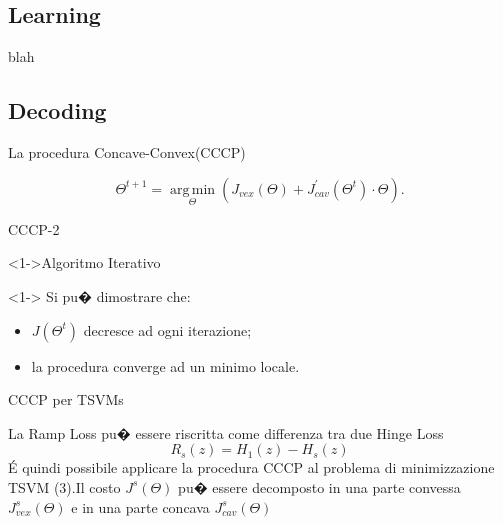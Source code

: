\documentclass[mathserif]{beamer}
\begin{document}
\subsection{Learning}

\begin{frame}
 \begin{block}{}
  blah
 \end{block}

\end{frame}
\subsection{Decoding}

\begin{frame}{La procedura Concave-Convex(CCCP)}


\begin{equation}
	\Theta^{t+1}=\underset{\Theta}{\operatorname{arg\,min}}(J_{vex}(\Theta)+J_{cav}^{\prime}(\Theta^t)\cdot \Theta).
\end{equation}

\end{frame}


\begin{frame}{CCCP-2}
\begin{block}<1->{Algoritmo Iterativo}
\end{block}


\begin{block}<1-> {}
Si pu� dimostrare che:
\begin{itemize}
	\item<1->  $J(\Theta^t)$ decresce ad ogni iterazione;
	\item<1-> la procedura converge ad un minimo locale.
\end{itemize}
\end{block}
\end{frame}


\begin{frame}{CCCP per TSVMs}
\begin{block}{}
La Ramp Loss pu� essere riscritta come differenza tra due Hinge Loss
\begin{equation}
	R_s(z)=H_1(z)-H_s(z)
\end{equation}
\'E quindi possibile applicare la procedura CCCP al problema di minimizzazione TSVM (3).Il costo $J^s(\Theta)$ pu� essere decomposto in una parte convessa $J^s_{vex}(\Theta)$ e in una parte concava $J^s_{cav}(\Theta)$
\end{block}
\end{frame}
\end{document}
